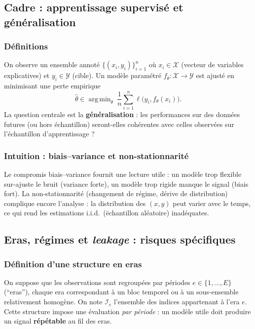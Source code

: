 \documentclass[11pt,a4paper]{article}
\newcommand{\1}{\mathbf{1}}
\DeclareMathOperator*{\argmin}{arg\,min}
\begin{document}
\subsection{Cadre : apprentissage supervis\'e et g\'en\'eralisation}

\subsubsection{D\'efinitions}
On observe un ensemble annot\'e $\{(x_i,y_i)\}_{i=1}^n$ o\`u $x_i\in\mathcal{X}$ (vecteur de variables explicatives) et $y_i\in\mathcal{Y}$ (cible).
Un mod\`ele param\'etr\'e $f_\theta:\mathcal{X}\to\mathcal{Y}$ est ajust\'e en minimisant une perte empirique
\[
\widehat\theta\in\argmin_{\theta}\ \frac{1}{n}\sum_{i=1}^n \ell\bigl(y_i,f_\theta(x_i)\bigr).
\]
La question centrale est la \textbf{g\'en\'eralisation} : les performances sur des donn\'ees futures (ou hors \'echantillon) seront-elles coh\'erentes
avec celles observ\'ees sur l'\'echantillon d'apprentissage ?

\subsubsection{Intuition : biais--variance et non-stationnarit\'e}
Le compromis biais--variance fournit une lecture utile : un mod\`ele trop flexible sur-ajuste le bruit (variance forte), un mod\`ele trop rigide
manque le signal (biais fort). La non-stationnarit\'e (changement de r\'egime, d\'erive de distribution) complique encore l'analyse : la distribution
des $(x,y)$ peut varier avec le temps, ce qui rend les estimations i.i.d.\ (\"echantillon al\'eatoire) inad\'equates.

\subsection{Eras, r\'egimes et \emph{leakage} : risques sp\'ecifiques}

\subsubsection{D\'efinition d'une structure en eras}
On suppose que les observations sont regroup\'ees par p\'eriodes $e\in\{1,\dots,E\}$ (``eras''), chaque era correspondant \`a un bloc temporel
ou \`a un sous-ensemble relativement homog\`ene. On note $\mathcal{I}_e$ l'ensemble des indices appartenant \`a l'era $e$.
Cette structure impose une \'evaluation \emph{par p\'eriode} : un mod\`ele utile doit produire un signal \textbf{r\'ep\'etable} au fil des eras.
\end{document}
